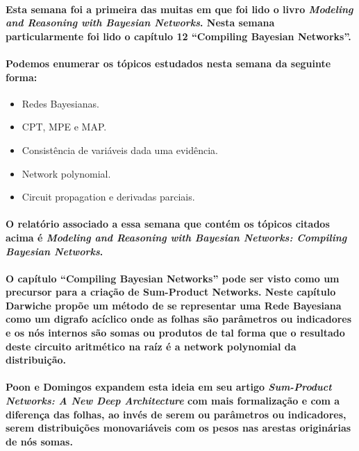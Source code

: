 \documentclass[a4paper,10pt]{article}
\theoremstyle{plain}
\begin{document}
\paragraph{
  Esta semana foi a primeira das muitas em que foi lido o livro \textit{Modeling and Reasoning with
  Bayesian Networks}\cite{bayes-net-darwiche}. Nesta semana particularmente foi lido o capítulo
  12 ``Compiling Bayesian Networks''.
}

\paragraph{
  Podemos enumerar os tópicos estudados nesta semana da seguinte forma:
}

\begin{itemize}
  \item Redes Bayesianas.
  \item CPT, MPE e MAP.
  \item Consistência de variáveis dada uma evidência.
  \item Network polynomial.
  \item Circuit propagation e derivadas parciais.
\end{itemize}

\paragraph{
  O relatório associado a essa semana que contém os tópicos citados acima é \textit{Modeling and
  Reasoning with Bayesian Networks: Compiling Bayesian Networks}\cite{report-1}.
}

\paragraph{
  O capítulo ``Compiling Bayesian Networks'' pode ser visto como um precursor para a criação de
  Sum-Product Networks. Neste capítulo Darwiche propõe um método de se representar uma Rede
  Bayesiana como um digrafo acíclico onde as folhas são parâmetros ou indicadores e os
  nós internos são somas ou produtos de tal forma que o resultado deste circuito aritmético na raíz
  é a network polynomial da distribuição.
}

\paragraph{
  Poon e Domingos expandem esta ideia em seu artigo \textit{Sum-Product Networks: A New Deep
  Architecture}\cite{poon-domingos} com mais formalização e com a diferença das folhas, ao invés
  de serem ou parâmetros ou indicadores, serem distribuições monovariáveis com os pesos nas arestas
  originárias de nós somas.
}
\end{document}

